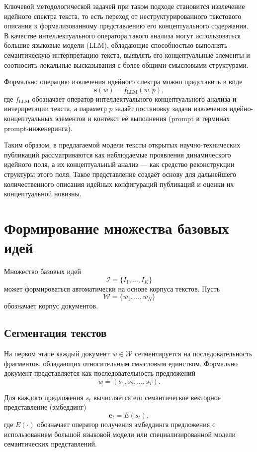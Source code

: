 \documentclass[review,3p,times]{elsarticle}
\begin{document}
Ключевой методологической задачей при таком подходе становится извлечение идейного спектра текста, то есть переход от неструктурированного текстового описания к формализованному представлению его концептуального содержания. В качестве интеллектуального оператора такого анализа могут использоваться большие языковые модели (LLM), обладающие способностью выполнять семантическую интерпретацию текста, выявлять его концептуальные элементы и соотносить локальные высказывания с более общими смысловыми структурами.

Формально операцию извлечения идейного спектра можно представить в виде
\begin{equation}
\mathbf{s}(w)=f_{\mathrm{LLM}}(w,p),
\label{eq:llm_operator}
\end{equation}
где $f_{\mathrm{LLM}}$ обозначает оператор интеллектуального концептуального анализа и интерпретации текста, а параметр $p$ задаёт постановку задачи извлечения идейно-концептуальных элементов и контекст её выполнения (prompt в терминах prompt-инженеринга).

Таким образом, в предлагаемой модели тексты открытых научно-технических публикаций рассматриваются как наблюдаемые проявления динамического идейного поля, а их концептуальный анализ — как средство реконструкции структуры этого поля. Такое представление создаёт основу для дальнейшего количественного описания идейных конфигураций публикаций и оценки их концептуальной новизны.



\section{Формирование множества базовых идей}

Множество базовых идей 
\[
\mathcal{I}=\{I_1,\dots,I_K\}
\]
может формироваться автоматически на основе корпуса текстов. Пусть 
\[
\mathcal{W}=\{w_1,\dots,w_N\}
\]
обозначает корпус документов.

\subsection{Сегментация текстов}

На первом этапе каждый документ $w \in \mathcal{W}$ сегментируется на последовательность фрагментов, обладающих относительным смысловым единством. Формально документ представляется как последовательность предложений
\[
w=(s_1,s_2,\dots,s_T).
\]

Для каждого предложения $s_t$ вычисляется его семантическое векторное представление (эмбеддинг)
\[
\mathbf{e}_t = E(s_t),
\]
где $E(\cdot)$ обозначает оператор получения эмбеддинга предложения с использованием большой языковой модели или специализированной модели семантических представлений.
\end{document}

